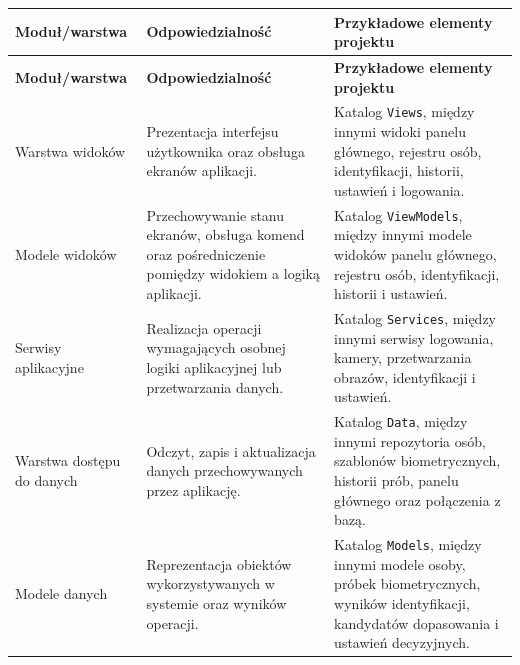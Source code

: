 \begin{xltabular}{\textwidth}{|p{2.9cm}|X|p{5.8cm}|}
    \hline
    \textbf{Moduł/warstwa} & \textbf{Odpowiedzialność} & \textbf{Przykładowe elementy \newline projektu} \\
    \hline
    \endfirsthead

    \hline
    \textbf{Moduł/warstwa} & \textbf{Odpowiedzialność} & \textbf{Przykładowe elementy \newline projektu} \\
    \hline
    \endhead

    Warstwa widoków & Prezentacja interfejsu użytkownika oraz obsługa ekranów aplikacji. & Katalog \texttt{Views}, między innymi widoki panelu głównego, rejestru osób, \newline identyfikacji, historii, ustawień i \newline logowania. \\
    \hline
    Modele widoków & Przechowywanie stanu ekranów, obsługa komend oraz \newline pośredniczenie pomiędzy \newline widokiem a logiką aplikacji. & Katalog \texttt{ViewModels}, między innymi modele widoków panelu głównego, \newline rejestru osób, identyfikacji, historii i \newline ustawień. \\
    \hline
    Serwisy aplikacyjne & Realizacja operacji wymagających osobnej logiki aplikacyjnej lub przetwarzania danych. & Katalog \texttt{Services}, między innymi \newline serwisy logowania, kamery, \newline przetwarzania obrazów, identyfikacji i ustawień. \\
    \hline
    Warstwa dostępu \newline do danych & Odczyt, zapis i aktualizacja danych przechowywanych przez aplikację. & Katalog \texttt{Data}, między innymi \newline repozytoria osób, szablonów \newline biometrycznych, historii prób, panelu głównego oraz połączenia z bazą. \\
    \hline
    Modele danych & Reprezentacja obiektów \newline wykorzystywanych w systemie oraz wyników operacji. & Katalog \texttt{Models}, między innymi modele osoby, próbek biometrycznych, wyników identyfikacji, kandydatów dopasowania i ustawień decyzyjnych. \\

\end{xltabular}
